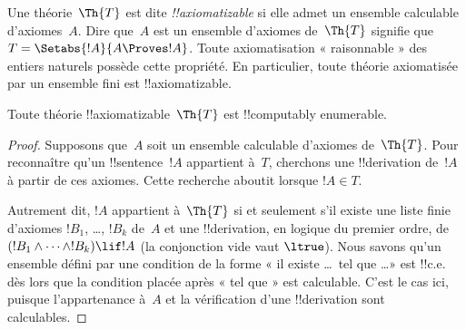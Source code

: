 \documentclass[../../../include/open-logic-section]{subfiles}
\begin{document}


Une théorie~$\Th{T}$ est dite \emph{!!{axiomatizable}}
si elle admet un ensemble calculable d'axiomes~$A$.
Dire que~$A$ est un ensemble d'axiomes de~$\Th{T}$
signifie que $T=\Setabs{!A}{A \Proves !A}$.
Toute axiomatisation « raisonnable » des entiers
naturels possède cette propriété. En particulier,
toute théorie axiomatisée par un ensemble fini est
!!{axiomatizable}.

\begin{lem}
Toute théorie !!{axiomatizable}~$\Th{T}$ est
!!{computably enumerable}.
\end{lem}

\begin{proof}
Supposons que~$A$ soit un ensemble calculable
d'axiomes de~$\Th{T}$. Pour reconnaître qu'un
!!{sentence}~$!A$ appartient à~$T$, cherchons une
!!{derivation} de~$!A$ à partir de ces axiomes.
Cette recherche aboutit lorsque $!A\in T$.

Autrement dit, $!A$ appartient à~$\Th{T}$ si et
seulement s'il existe une liste finie d'axiomes
$!B_1$, \dots, $!B_k$ de~$A$ et une
!!{derivation}, en logique du premier ordre, de
$(!B_1\land\dots\land !B_k)\lif !A$ (la conjonction vide vaut $\ltrue$).
Nous savons qu'un ensemble défini par une condition
de la forme « il existe \dots\ tel que \dots » est
!!{c.e.} dès lors que la condition placée après
« tel que » est calculable. C'est le cas ici, puisque
l'appartenance à~$A$ et la vérification d'une
!!{derivation} sont calculables.
\end{proof}
\end{document}
